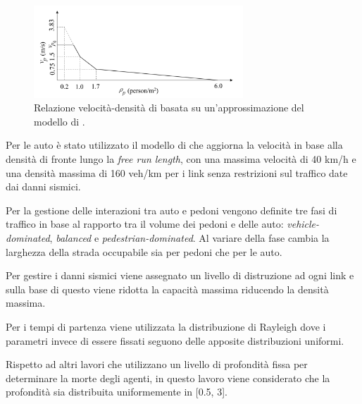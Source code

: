 \begin{figure}[ht]
    \centering
    \includegraphics[width=0.7\textwidth]{images/speed_WANG.png}
    \caption{Relazione velocità-densità di \textcite{wang2021novel} basata su un'approssimazione del modello di \textcite{goto2012tsunami}.}
    \label{fig:wang2021}
\end{figure}

Per le auto è stato utilizzato il modello di \textcite{greenshields1935study} che aggiorna la velocità in base alla densità di fronte lungo la \textit{free run length},
con una massima velocità di 40 km/h e una densità massima di 160 veh/km per i link senza restrizioni sul traffico date dai danni sismici.

Per la gestione delle interazioni tra auto e pedoni vengono definite tre fasi di traffico in base al rapporto
tra il volume dei pedoni e delle auto: \textit{vehicle-dominated}, \textit{balanced} e \textit{pedestrian-dominated}.
Al variare della fase cambia la larghezza della strada occupabile sia per pedoni che per le auto.

Per gestire i danni sismici viene assegnato un livello di distruzione ad ogni link e sulla base di questo viene 
ridotta la capacità massima riducendo la densità massima.

Per i tempi di partenza viene utilizzata la distribuzione di Rayleigh dove i parametri
invece di essere fissati seguono delle apposite distribuzioni uniformi.

Rispetto ad altri lavori che utilizzano un livello di profondità fissa per determinare la morte degli agenti, in questo lavoro
viene considerato che la profondità sia distribuita uniformemente in [0.5, 3]. 
